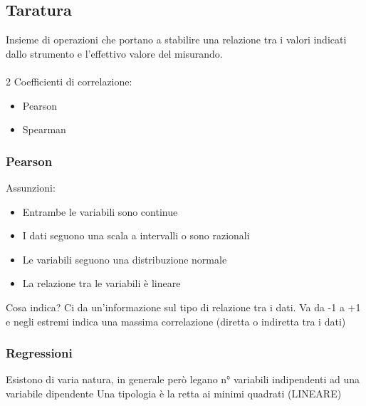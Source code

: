 \documentclass{article}
\begin{document}
\newpage

\subsection{Taratura}
Insieme di operazioni che portano a stabilire una relazione tra i valori indicati dallo strumento e l'effettivo valore del misurando.
\\\\
2 Coefficienti di correlazione:
\begin{itemize}
	\item Pearson
	\item Spearman
\end{itemize}

\subsubsection{Pearson}
Assunzioni:
\begin{itemize}
	\item Entrambe le variabili sono continue
	\item I dati seguono una scala a intervalli o sono razionali
	\item Le variabili seguono una distribuzione normale
	\item La relazione tra le variabili è lineare
\end{itemize}
%
Cosa indica? Ci da un'informazione sul tipo di relazione tra i dati. Va da -1 a +1 e negli estremi indica una massima correlazione (diretta o indiretta tra i dati)

\subsubsection{Regressioni}
Esistono di varia natura, in generale però legano n° variabili indipendenti ad una variabile dipendente
Una tipologia è la retta ai minimi quadrati (LINEARE)
\end{document}
